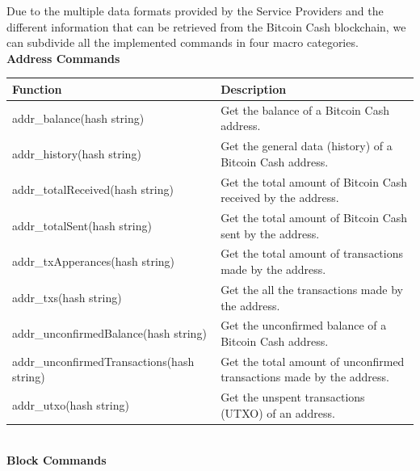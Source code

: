 Due to the multiple data formats provided by the Service Providers and the 
different information that can be retrieved from the Bitcoin Cash blockchain, 
we can subdivide all the implemented commands in four macro categories.\medskip\\
\textbf{Address Commands}
\begin{table}[!ht]
    \centering
    \begin{tabular}{||l|p{6cm}||}
    \hline
    \textbf{Function}                          & \textbf{Description}                                                  \\ \hline
    addr\_balance(hash string)                 & Get the balance of a Bitcoin Cash address.                            \\ \hline
    addr\_history(hash string)                 & Get the general data (history) of a Bitcoin Cash address.             \\ \hline
    addr\_totalReceived(hash string)           & Get the total amount of Bitcoin Cash received by the address.         \\ \hline
    addr\_totalSent(hash string)               & Get the total amount of Bitcoin Cash sent by the address.             \\ \hline
    addr\_txApperances(hash string)            & Get the total amount of transactions made by the address.             \\ \hline
    addr\_txs(hash string)                     & Get the all the transactions made by the address.                     \\ \hline
    addr\_unconfirmedBalance(hash string)      & Get the unconfirmed balance of a Bitcoin Cash address.                \\ \hline
    addr\_unconfirmedTransactions(hash string) & Get the total amount of unconfirmed transactions made by the address. \\ \hline
    addr\_utxo(hash string)                    & Get the unspent transactions (UTXO) of an address.                    \\ \hline
    \end{tabular}
    \end{table}
\medskip\\
\textbf{Block Commands}
